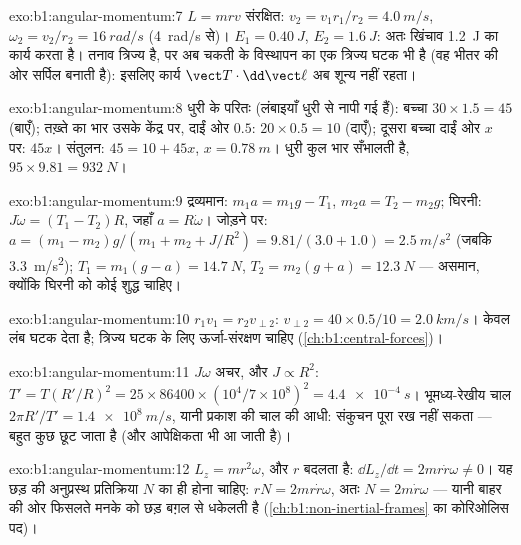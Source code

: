 \begin{solution}{exo:b1:angular-momentum:7}
$L = mrv$ संरक्षित: $v_2 = v_1r_1/r_2 = \qty{4.0}{m/s}$, $\omega_2 = v_2/r_2
= \qty{16}{rad/s}$ (\qty{4}{rad/s} से)। $E_1 = \qty{0.40}{J}$, $E_2 =
\qty{1.6}{J}$: अतः खिंचाव \qty{1.2}{J} का कार्य करता है। तनाव त्रिज्य है,
पर अब चकती के विस्थापन का एक त्रिज्य घटक भी है (वह भीतर की ओर सर्पिल बनाती
है): इसलिए कार्य $\vect T\cdot\dd\vect\ell$ अब शून्य नहीं रहता।
\end{solution}

\begin{solution}{exo:b1:angular-momentum:8}
धुरी के परितः  (लंबाइयाँ धुरी से नापी गई हैं): बच्चा $30 \times 1.5 =
45$ (बाएँ); तख़्ते का भार उसके केंद्र पर, दाईं ओर $0.5$: $20 \times
0.5 = 10$ (दाएँ); दूसरा बच्चा दाईं ओर $x$ पर: $45x$। संतुलन:
$45 = 10 + 45x$, $x = \qty{0.78}{m}$। धुरी कुल भार सँभालती है,
$95 \times 9.81 = \qty{932}{N}$।
\end{solution}

\begin{solution}{exo:b1:angular-momentum:9}
द्रव्यमान: $m_1a = m_1g - T_1$, $m_2a = T_2 - m_2g$; घिरनी: $J\dot\omega =
(T_1 - T_2)R$, जहाँ $a = R\dot\omega$। जोड़ने पर: $a = (m_1 - m_2)g/(m_1 + m_2 +
J/R^2) = 9.81/(3.0 + 1.0) = \qty{2.5}{m/s^2}$ (जबकि \qty{3.3}{m/s^2});
$T_1 = m_1(g - a) = \qty{14.7}{N}$, $T_2 = m_2(g + a) = \qty{12.3}{N}$ ---
असमान, क्योंकि घिरनी को कोई शुद्ध  चाहिए।
\end{solution}

\begin{solution}{exo:b1:angular-momentum:10}
$r_1v_1 = r_2v_{\perp 2}$: $v_{\perp 2} = 40 \times 0.5/10 = \qty{2.0}{km/s}$।
 केवल लंब घटक देता है; त्रिज्य घटक के लिए ऊर्जा-संरक्षण
चाहिए (\cref{ch:b1:central-forces})।
\end{solution}

\begin{solution}{exo:b1:angular-momentum:11}
$J\omega$ अचर, और $J \propto R^2$: $T' = T(R'/R)^2 = 25 \times 86400
\times (10^4/7\times10^8)^2 = \qty{4.4e-4}{s}$। भूमध्य-रेखीय चाल $2\pi R'/T'
= \qty{1.4e8}{m/s}$, यानी प्रकाश की चाल की आधी: संकुचन पूरा  रख
नहीं सकता --- बहुत कुछ छूट जाता है (और आपेक्षिकता भी आ जाती है)।
\end{solution}

\begin{solution}{exo:b1:angular-momentum:12}
$L_z = mr^2\omega$, और $r$ बदलता है: $\dd L_z/\dd t = 2mr\dot r\omega \neq 0$।
यह छड़ की अनुप्रस्थ प्रतिक्रिया $N$ का  ही होना चाहिए: $rN =
2mr\dot r\omega$, अतः $N = 2m\dot r\omega$ --- यानी बाहर की ओर फिसलते मनके को
छड़ बग़ल से धकेलती है (\cref{ch:b1:non-inertial-frames} का कोरिओलिस पद)।
\end{solution}

